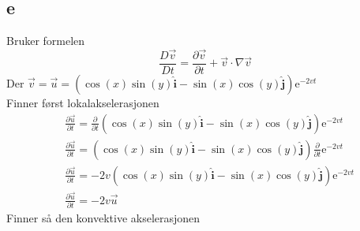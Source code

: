 \documentclass[a4paper,10pt,norsk]{article}
\newcommand{\uvec}[1]{\boldsymbol{\hat{\textbf{#1}}}}
\begin{document}
	\subsection*{e}
		Bruker formelen \[
		\frac{D \vec{v} }{D t} = \frac{\partial \vec{v} }{\partial t}  + \vec{v} \cdot \nabla \vec{v} 
		\] 
		Der $\vec{v} = \vec{u} = \left( \cos(x) \sin(y) \uvec{i} - \sin(x) \cos(y) \uvec{j} \right) \mathrm{e}^{-2vt} $\\
		Finner først lokalakselerasjonen
		\begin{align*}
			&\frac{\partial \vec{u} }{\partial t} = \frac{\partial }{\partial t} \left( \cos(x) \sin(y) \uvec{i} - \sin(x) \cos(y) \uvec{j} \right) \mathrm{e}^{-2vt}\\
			&\frac{\partial \vec{u} }{\partial t} = \left( \cos(x) \sin(y) \uvec{i} - \sin(x) \cos(y) \uvec{j} \right) \frac{\partial }{\partial t} \mathrm{e}^{-2vt}\\ 
			&\frac{\partial \vec{u} }{\partial t} = -2v\left( \cos(x) \sin(y) \uvec{i} - \sin(x) \cos(y) \uvec{j} \right)\mathrm{e}^{-2vt}\\
			&\frac{\partial \vec{u} }{\partial t} = -2v \vec{u} 
		\end{align*}
		Finner så den konvektive akselerasjonen
\end{document}
